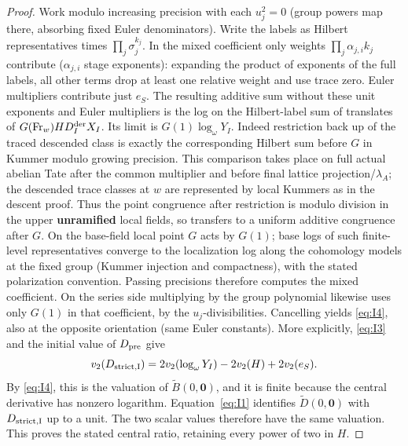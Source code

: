 \begin{proof}
Work modulo increasing precision with each \(u_j^2=0\) (group powers map there, absorbing fixed Euler denominators). Write the labels as Hilbert representatives times \(\prod_j\sigma_j^{k_j}\). In the mixed coefficient only weights \(\prod_j\alpha_{j,i} k_j\) contribute (\(\alpha_{j,i}\) stage exponents): expanding the product of exponents of the full labels, all other terms drop at least one relative weight and use trace zero. Euler multipliers contribute just \(e_S\). The resulting additive sum without these unit exponents and Euler multipliers is the log on the Hilbert-label sum of translates of \(G(\mathrm{Fr}_w)H D_I^{\rm der}X_I\). Its limit is \(G(1)\log_\omega Y_I\). Indeed restriction back up of the traced descended class is exactly the corresponding Hilbert sum before \(G\) in Kummer modulo growing precision. This comparison takes place on full actual abelian Tate after the common multiplier and before final lattice projection/\(\lambda_A\); the descended trace classes at \(w\) are represented by local Kummers as in the descent proof. Thus the point congruence after restriction is modulo division in the upper \textbf{unramified} local fields, so transfers to a uniform additive congruence after \(G\). On the base-field local point \(G\) acts by \(G(1)\); base logs of such finite-level representatives converge to the localization log along the cohomology models at the fixed group (Kummer injection and compactness), with the stated polarization convention. Passing precisions therefore computes the mixed coefficient. On the series side multiplying by the group polynomial likewise uses only \(G(1)\) in that coefficient, by the \(u_j\)-divisibilities. Cancelling yields \eqref{eq:I4}, also at the opposite orientation (same Euler constants). More explicitly, \eqref{eq:I3} and the initial value of \(D_{\rm pre}\) give
\[
v_2(D_{\rm strict,I})
 =2v_2(\log_\omega Y_I)-2v_2(H)+2v_2(e_S).
\]
By \eqref{eq:I4}, this is the valuation of
\(\widetilde B(0,\mathbf0)\), and it is finite because the central
derivative has nonzero logarithm. Equation~\eqref{eq:I1} identifies
\(\widetilde D(0,\mathbf0)\) with \(D_{\rm strict,I}\) up to a
unit. The two scalar values therefore have the same valuation. This
proves the stated central ratio, retaining every power of two in \(H\).
\end{proof}

